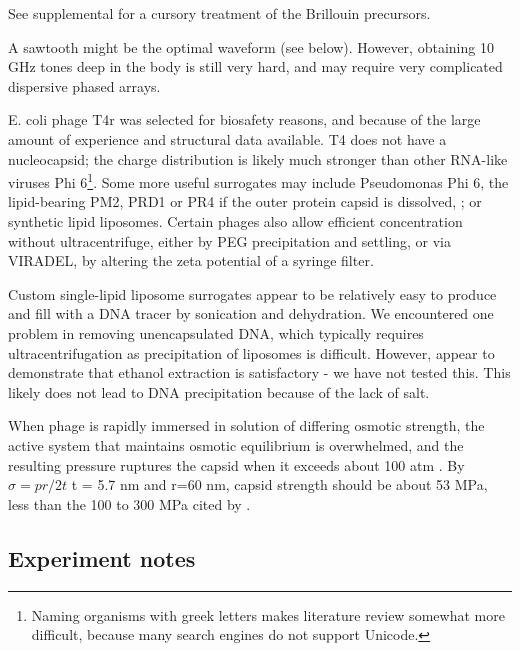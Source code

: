 \documentclass[paper.tex]{subfiles}
\begin{document}
\begin{multicols}{1}
See supplemental for a cursory treatment of the Brillouin precursors.

A sawtooth might be the optimal waveform (see below). However, obtaining 10 GHz tones deep in the body is still very hard, and may require very complicated dispersive phased arrays\cite{Microwave1982a}.


E. coli phage T4r was selected for biosafety reasons, and because of the large amount of experience\cite{History1995} and structural data available. T4 does not have a nucleocapsid; the charge distribution is likely much stronger than other RNA-like viruses Phi 6\footnote{Naming organisms with greek letters makes literature review somewhat more difficult, because many search engines do not support Unicode.}. Some more useful surrogates may include Pseudomonas Phi 6\cite{Selection2017}, the lipid-bearing PM2, PRD1 or PR4\cite{Lipidcontaining1979} if the outer protein capsid is dissolved\cite{Bacteriophage2002}, \cite{Dissociation1993}; or synthetic lipid liposomes. Certain phages also allow efficient concentration without ultracentrifuge, either by PEG precipitation\cite{Rapid1970} and settling, or via VIRADEL\cite{GROWTH}\cite{Chemical1982}\cite{highly1988}\cite{AdsorptionElution1989}, by altering the zeta potential of a syringe filter. 

Custom single-lipid liposome surrogates appear to be relatively easy to produce and fill with a DNA tracer by sonication and dehydration\cite{Encapsulation1982}\cite{OPTIMIZATION2017}\cite{Liposome2014}. We encountered one problem in removing unencapsulated DNA, which typically requires ultracentrifugation as precipitation of liposomes is difficult. However, \cite{novela} appear to demonstrate that ethanol extraction is satisfactory - we have not tested this. This likely does not lead to DNA precipitation because of the lack of salt. 

When phage is rapidly immersed in solution of differing osmotic strength, the active system that maintains osmotic equilibrium is overwhelmed, and the resulting pressure ruptures the capsid when it exceeds about 100 atm \cite{Osmotic2003}. By $\sigma = pr / 2t $ t = 5.7 nm\cite{Head1988} and r=60 nm, capsid strength should be about 53 MPa, less than the 100 to 300 MPa cited by \cite{Bacteriophage2004}.

\subsection{Experiment notes}


\end{multicols}
\end{document}
